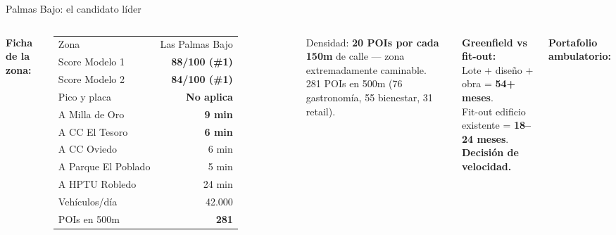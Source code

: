 \documentclass[aspectratio=169, 11pt]{beamer}
\begin{document}
\begin{frame}{Palmas Bajo: el candidato l\'{i}der}

\vspace{-2pt}
\begin{columns}[T]
\vspace{2pt}
{\scriptsize\textbf{Ficha de la zona:}}
\vspace{1pt}

{\tiny
\begin{tabular}{@{}lr@{}}
\toprule
Zona & Las Palmas Bajo \\
Score Modelo 1 & \textcolor{acc}{\textbf{88/100 (\#1)}} \\
Score Modelo 2 & \textcolor{acc}{\textbf{84/100 (\#1)}} \\
Pico y placa & \textcolor{acc}{\textbf{No aplica}} \\
A Milla de Oro & \textcolor{acc}{\textbf{9 min}} \\
A CC El Tesoro & \textcolor{acc}{\textbf{6 min}} \\
A CC Oviedo & 6 min \\
A Parque El Poblado & 5 min \\
A HPTU Robledo & 24 min \\
Veh\'{i}culos/d\'{i}a & 42.000 \\
POIs en 500m & \textcolor{acc}{\textbf{281}} \\
\bottomrule
\end{tabular}
}

\vspace{2pt}
{\tiny Densidad: \textbf{20 POIs por cada 150m} de calle --- zona extremadamente caminable.\\
281 POIs en 500m (76 gastronom\'{i}a, 55 bienestar, 31 retail).}

\vspace{2pt}
{\scriptsize\textbf{Greenfield vs fit-out:}\\
Lote + dise\~{n}o + obra = \textbf{54+ meses}.\\
Fit-out edificio existente = \textbf{18--24 meses}.\\
\textcolor{acc}{\textbf{Decisi\'{o}n de velocidad.}}}

\vspace{2pt}
{\scriptsize\textbf{Portafolio ambulatorio:}}
\vspace{2pt}


\end{columns}
\end{frame}
\end{document}
